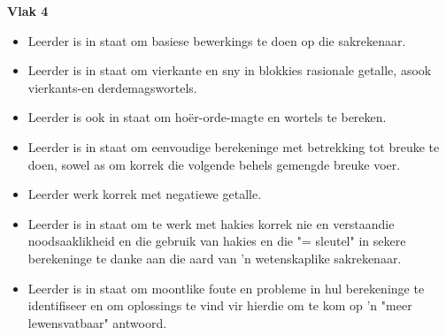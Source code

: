 \textbf{Vlak 4}\begin{itemize}[noitemsep]
\item
Leerder is in staat om basiese bewerkings te doen op die sakrekenaar.
\item
Leerder is in staat om vierkante en sny in blokkies rasionale getalle,
asook vierkants-en derdemagswortels.
\item
Leerder is ook in staat om hoër-orde-magte en wortels te bereken.
\item
Leerder is in staat om eenvoudige berekeninge met betrekking tot
breuke te doen, sowel as om korrek die volgende behels gemengde breuke
voer.
\item
Leerder werk korrek met negatiewe getalle.
\item
Leerder is in staat om te werk met hakies korrek nie en verstaan ​​die
noodsaaklikheid en die gebruik van hakies en die "= sleutel" in sekere
berekeninge te danke aan die aard van 'n wetenskaplike sakrekenaar.
\item
Leerder is in staat om moontlike foute en probleme in hul berekeninge
te identifiseer en om oplossings te vind vir hierdie om te kom op 'n
"meer lewensvatbaar" antwoord.
\end{itemize}

